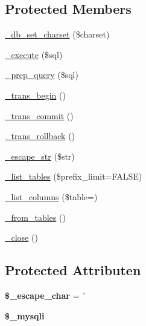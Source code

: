 \subsection*{Protected Members}
\begin{DoxyCompactItemize}
\item 
\mbox{\hyperlink{class_c_i___d_b__mysqli__driver_a2b808d420d8e9fea0b73ad7127f5efb8}{\+\_\+db\+\_\+set\+\_\+charset}} (\$charset)
\item 
\mbox{\hyperlink{class_c_i___d_b__mysqli__driver_a114ab675d89bf8324a41785fb475e86d}{\+\_\+execute}} (\$sql)
\item 
\mbox{\hyperlink{class_c_i___d_b__mysqli__driver_a86af88ef0fa6d44ab4691e3f53270339}{\+\_\+prep\+\_\+query}} (\$sql)
\item 
\mbox{\hyperlink{class_c_i___d_b__mysqli__driver_ac81ac882c1d54347d810199a15856aac}{\+\_\+trans\+\_\+begin}} ()
\item 
\mbox{\hyperlink{class_c_i___d_b__mysqli__driver_a6fe7f373e0b11cfae23a5f41c0b35dda}{\+\_\+trans\+\_\+commit}} ()
\item 
\mbox{\hyperlink{class_c_i___d_b__mysqli__driver_ad49a116b0776c26b53114c9093fd102a}{\+\_\+trans\+\_\+rollback}} ()
\item 
\mbox{\hyperlink{class_c_i___d_b__mysqli__driver_af8ef0237bfcdb19215b63fff769e7a55}{\+\_\+escape\+\_\+str}} (\$str)
\item 
\mbox{\hyperlink{class_c_i___d_b__mysqli__driver_a435c0f3ce54fe7daa178baa8532ebd54}{\+\_\+list\+\_\+tables}} (\$prefix\+\_\+limit=F\+A\+L\+SE)
\item 
\mbox{\hyperlink{class_c_i___d_b__mysqli__driver_a7ccb7f9c301fe7f0a9db701254142b63}{\+\_\+list\+\_\+columns}} (\$table=\textquotesingle{}\textquotesingle{})
\item 
\mbox{\hyperlink{class_c_i___d_b__mysqli__driver_aef43f7e3e7b71d337ff3724c5eb14f10}{\+\_\+from\+\_\+tables}} ()
\item 
\mbox{\hyperlink{class_c_i___d_b__mysqli__driver_a4d9082658000e5ede8312067c6dda9db}{\+\_\+close}} ()
\end{DoxyCompactItemize}
\subsection*{Protected Attributen}
\begin{DoxyCompactItemize}
\item 
\mbox{\label{class_c_i___d_b__mysqli__driver_aaec2fb0112850159063a8e47ad3aed6e}} 
{\bfseries \$\+\_\+escape\+\_\+char} = \textquotesingle{}\`{}\textquotesingle{}
\item 
\mbox{\label{class_c_i___d_b__mysqli__driver_ade098f0cd94dc706b24ea590bd540bf4}} 
{\bfseries \$\+\_\+mysqli}
\end{DoxyCompactItemize}


